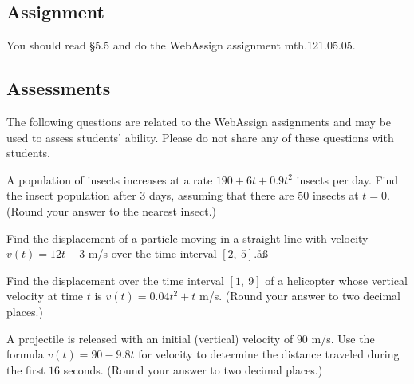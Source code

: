\documentclass[12pt,addpoints, answers, fleqn]{exam}
\begin{document}
\subsection{Assignment}
You should read \S  5.5 and do the WebAssign assignment mth.121.05.05.
\vfill
\pagebreak
\begin{teacher}
\subsection{Assessments}
The following questions are related to the WebAssign assignments and may be used to assess students' ability. Please do not share any of these questions with students.
\begin{questions}		
\question 	%

A population of insects increases at a rate $190 + 6t + 0.9t^2$ insects per day. Find the insect population after $3$ days, assuming that there are $50$ insects at $t = 0$. (Round your answer to the nearest insect.)
 
 \begin{solution}
 \end{solution}
 
\question 	%

Find the displacement of a particle moving in a straight line with velocity $v\left(t\right) = 12t - 3$ m/s over the time interval $\left[2, \ 5\right]$.åß
  
   \begin{solution}
 \end{solution}
 
\question 	%

Find the displacement over the time interval $\left[1, \ 9\right]$ of a helicopter whose vertical velocity at time $t$ is $v\left(t\right) = 0.04t^2 + t$ m/s. (Round your answer to two decimal places.)

 \begin{solution}
 \end{solution}
 
\question 	%

A projectile is released with an initial (vertical) velocity of $90$ m/s. Use the formula 
$v\left(t\right) = 90 - 9.8t$ for velocity to determine the distance traveled during the first $16$ seconds. (Round your answer to two decimal places.)


\end{questions}
\end{teacher}
\end{document}
